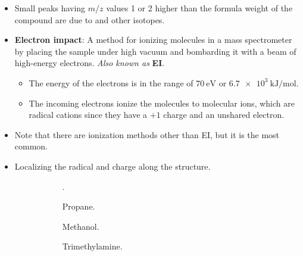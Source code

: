 \documentclass[../notes.tex]{subfiles}
\begin{document}
\begin{itemize}
\begin{itemize}
    \end{itemize}
    \item Small peaks having $m/z$ values 1 or 2 higher than the formula weight of the compound are due to  and other isotopes.
    \item \textbf{Electron impact}: A method for ionizing molecules in a mass spectrometer by placing the sample under high vacuum and bombarding it with a beam of high-energy electrons. \emph{Also known as} \textbf{EI}.
    \begin{itemize}
        \item The energy of the electrons is in the range of $\SI{70}{\electronvolt}$ or $\SI[per-mode=symbol]{6.7e3}{\kilo\joule\per\mole}$.
        \item The incoming electrons ionize the molecules to molecular ions, which are radical cations since they have a $+1$ charge and an unshared electron.
    \end{itemize}
    \item Note that there are ionization methods other than EI, but it is the most common.
    \item Localizing the radical and charge along the structure.
    \begin{figure}[H]
        \centering
        \footnotesize
        \begin{subfigure}[b]{0.24\linewidth}
            \centering
            \ce{[CH3CH2CH3]+}\hspace{-4.8pt}.
            \caption{Propane.}
            \label{fig:molecularIonsa}
        \end{subfigure}
        \begin{subfigure}[b]{0.24\linewidth}
            \centering
            \caption{Methanol.}
            \label{fig:molecularIonsb}
        \end{subfigure}
        \begin{subfigure}[b]{0.24\linewidth}
            \centering
            \caption{Trimethylamine.}
            \label{fig:molecularIonsc}
        \end{subfigure}
        \begin{subfigure}[b]{0.24\linewidth}
            \centering
\end{subfigure}
\end{figure}
\end{itemize}
\end{document}

